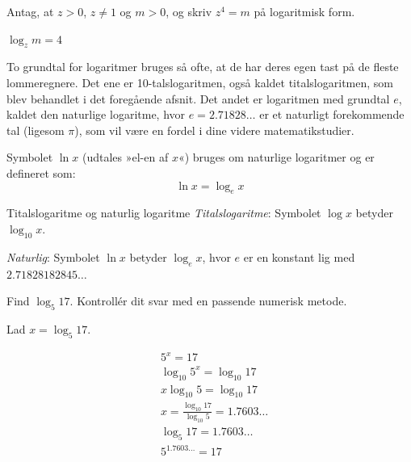 \begin{example} Antag, at $z>0$, $z\neq 1$ og $m>0$, og skriv $z^4=m$ på logaritmisk form.

\begin{solution}
    $\log _z m=4$
\end{solution}
    
\end{example}

To grundtal for logaritmer bruges så ofte, at de har deres egen tast på de fleste lommeregnere. Det ene er 10-talslogaritmen, også kaldet titalslogaritmen, som blev behandlet i det foregående afsnit. Det andet er logaritmen med grundtal \(e\), kaldet den naturlige logaritme, hvor \(e = 2.71828 \ldots\) er et naturligt forekommende tal (ligesom \(\pi\)), som vil være en fordel i dine videre matematikstudier.

Symbolet \(\ln x\) (udtales »el-en af \(x\)«) bruges om naturlige logaritmer og er defineret som:
\[
\ln x = \log_e x
\]

\begin{definition}{Titalslogaritme og naturlig logaritme}
\hspace{1cm} \textit{Titalslogaritme}: Symbolet $\log x$ betyder $\log _{10} x$.

\hspace{1cm}  \textit{Naturlig}: \hspace{0.2cm}Symbolet $\ln x$ betyder $\log _e x$, hvor $e$ er en konstant lig med $2.71828182845 \ldots$
\end{definition}

\begin{example}\label{ex:log5-17} Find $\log _5 17$. Kontrollér dit svar med en passende numerisk metode.

\begin{solution} Lad $x=\log _5 17$.

\begin{equation*}
\begin{aligned}
& 5^x=17 \\
& \log _{10} 5^x=\log _{10} 17 \\
& x \log _{10} 5=\log _{10} 17 \\
& x=\frac{\log _{10} 17}{\log _{10} 5}=1.7603 \ldots \\
& \log _5 17=1.7603 \ldots \\
& 5^{1.7603 \ldots}=17
\end{aligned}
\end{equation*}
\end{solution}
\end{example}

